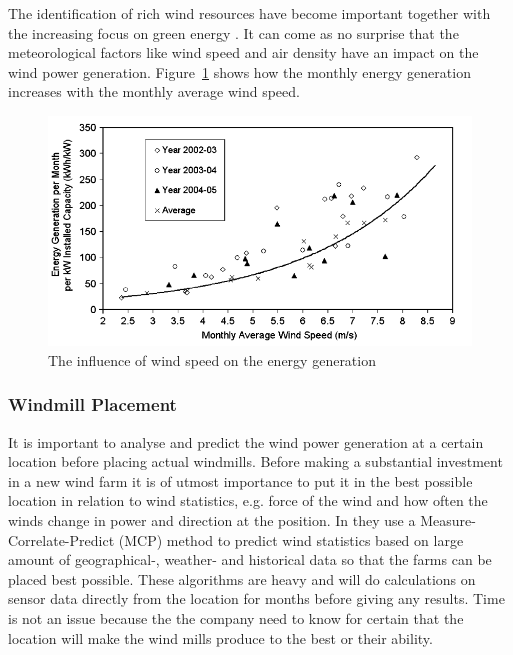 The identification of rich wind resources have become important together with the increasing focus on green energy \cite{WindPowerGenerationUsingANN}. It can come as no surprise that the meteorological factors like wind speed and air density have an impact on the wind power generation. Figure~\ref{fig:energyGeneration} shows how the monthly energy generation increases with the monthly average wind speed. 

\begin{figure}[h!]
\centering
\includegraphics[width=0.8\linewidth,natwidth=898,natheight=587]{billeder/EnergyGenerationVsWindSpeed.png}
\caption{The influence of wind speed on the energy generation \cite{WindPowerGenerationUsingANN}}
\label{fig:energyGeneration}
\end{figure} 

\subsubsection{Windmill Placement}
\label{sec:windmillPlacement}
It is important to analyse and predict the wind power generation at a certain location before placing actual windmills. Before making a substantial investment in a new wind farm it is of utmost importance to put it in the best possible location in relation to wind statistics, e.g. force of the wind and how often the winds change in power and direction at the position. In \cite{4} they use a Measure-Correlate-Predict (MCP) method to predict wind statistics based on large amount of geographical-, weather- and historical data so that the farms can be placed best possible. These algorithms are heavy and will do calculations on sensor data directly from the location for months before giving any results. Time is not an issue because the the company need to know for certain that the location will make the wind mills produce to the best or their ability.


